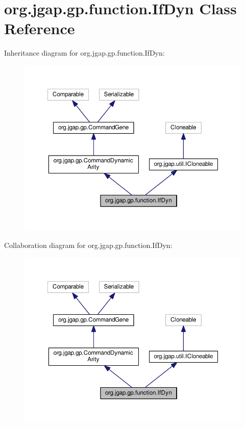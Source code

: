 \hypertarget{classorg_1_1jgap_1_1gp_1_1function_1_1_if_dyn}{\section{org.\-jgap.\-gp.\-function.\-If\-Dyn Class Reference}
\label{classorg_1_1jgap_1_1gp_1_1function_1_1_if_dyn}
}


Inheritance diagram for org.\-jgap.\-gp.\-function.\-If\-Dyn\-:
\nopagebreak
\begin{figure}[H]
\begin{center}
\leavevmode
\includegraphics[width=350pt]{classorg_1_1jgap_1_1gp_1_1function_1_1_if_dyn__inherit__graph}
\end{center}
\end{figure}


Collaboration diagram for org.\-jgap.\-gp.\-function.\-If\-Dyn\-:
\nopagebreak
\begin{figure}[H]
\begin{center}
\leavevmode
\includegraphics[width=350pt]{classorg_1_1jgap_1_1gp_1_1function_1_1_if_dyn__coll__graph}
\end{center}
\end{figure}
